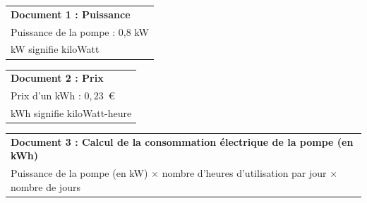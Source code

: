 \documentclass[exercice,a4]{thedocument}%
\begin{document}
\begin{enumerate}
\begin{minipage}{0.5\linewidth}
\begin{tabular}{|l|}\hline
\textbf{Document 1 : Puissance}\\
Puissance de la pompe : 0,8 kW\\
kW signifie kiloWatt\\ \hline
\end{tabular}
\end{minipage} \hspace{2.27cm}
\begin{minipage}{0.5\linewidth}
\begin{tabular}{|l|}\hline
\textbf{Document 2 : Prix}\\
Prix d'un kWh : $0,23$~\euro\\
kWh signifie kiloWatt-heure\\ \hline
\end{tabular}
\end{minipage}

\medskip

\begin{minipage}{\linewidth}
\begin{tabular}{|l|}\hline
\textbf{Document 3 : Calcul de la consommation électrique de la pompe (en kWh)}\\
Puissance de la pompe (en kW) $\times$ nombre d'heures d'utilisation par jour $\times$ nombre de jours\\ \hline
\end{tabular}
\end{minipage}
\end{enumerate}

\bigskip
\showthesource
\end{document}
